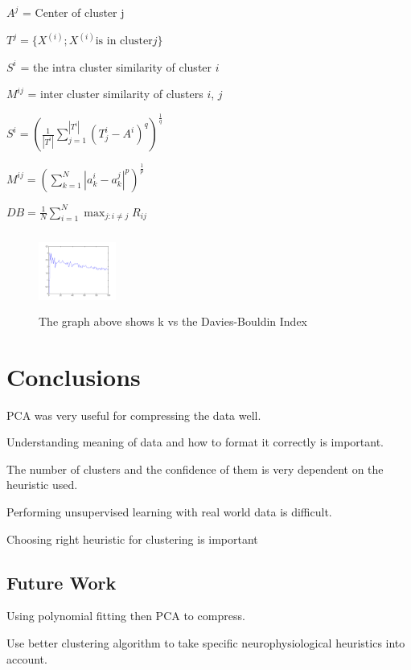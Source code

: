 \documentclass{acm_proc_article-sp}
\begin{document}
$A^j$ = Center of cluster j

$T^j = \{ {X^{(i)} ; X^{(i)} \text{is in cluster} j} \}$

$S^i$ = the intra cluster similarity of cluster $i$

$M^{ij}$ = inter cluster similarity of clusters $i$, $j$

$S^i = (\frac{1}{|T^i|} \sum\limits_{j=1}^{|T^i|} (T^i_j -A^i)^q)^{\frac{1}{q}}$

$M^{ij} = (\sum\limits_{k=1}^{N} |a^i_k - a^j_k|^p)^{\frac{1}{p}}$

$DB = \frac{1}{N} \sum\limits_{i=1}^N \max_{j:i \neq j} R_{ij}$

\begin{figure}
\centering
\includegraphics[width=1in,height=1in]{../poster/images/davies_k_vs_davies_index.png}
\caption{The graph above shows k vs the Davies-Bouldin Index}
\end{figure}


\section{Conclusions}
PCA was very useful for compressing the data well.

Understanding meaning of data and how to format it correctly is important.

The number of clusters and the confidence of them is very dependent on the
heuristic used. 

Performing unsupervised learning with real world data is difficult.

Choosing right heuristic for clustering is important

\subsection{Future Work}
Using polynomial fitting then PCA to compress.

Use better clustering algorithm to take specific
            neurophysiological heuristics into account.



%

%
%
\end{document}
